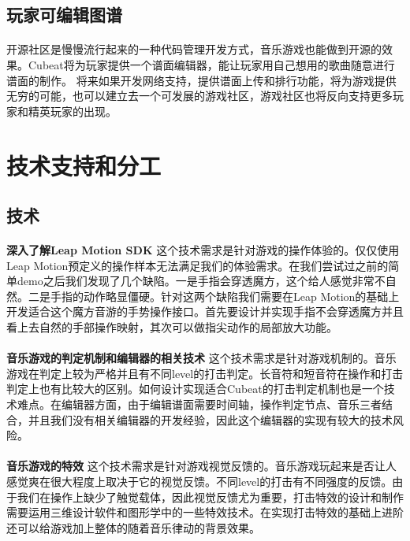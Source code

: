 \documentclass{article}
\begin{document}
\subsection{玩家可编辑图谱}
\paragraph{}
开源社区是慢慢流行起来的一种代码管理开发方式，音乐游戏也能做到开源的效果。Cubeat将为玩家提供一个谱面编辑器，能让玩家用自己想用的歌曲随意进行谱面的制作。
将来如果开发网络支持，提供谱面上传和排行功能，将为游戏提供无穷的可能，也可以建立去一个可发展的游戏社区，游戏社区也将反向支持更多玩家和精英玩家的出现。
\newpage
\section{技术支持和分工}
\subsection{技术}
\paragraph{}
\textbf{深入了解Leap Motion SDK}
这个技术需求是针对游戏的操作体验的。仅仅使用Leap Motion预定义的操作样本无法满足我们的体验需求。在我们尝试过之前的简单demo之后我们发现了几个缺陷。一是手指会穿透魔方，这个给人感觉非常不自然。二是手指的动作略显僵硬。针对这两个缺陷我们需要在Leap Motion的基础上开发适合这个魔方音游的手势操作接口。首先要设计并实现手指不会穿透魔方并且看上去自然的手部操作映射，其次可以做指尖动作的局部放大功能。
\paragraph{}
\textbf{音乐游戏的判定机制和编辑器的相关技术}
这个技术需求是针对游戏机制的。音乐游戏在判定上较为严格并且有不同level的打击判定。长音符和短音符在操作和打击判定上也有比较大的区别。如何设计实现适合Cubeat的打击判定机制也是一个技术难点。在编辑器方面，由于编辑谱面需要时间轴，操作判定节点、音乐三者结合，并且我们没有相关编辑器的开发经验，因此这个编辑器的实现有较大的技术风险。
\paragraph{}
\textbf{音乐游戏的特效}
这个技术需求是针对游戏视觉反馈的。音乐游戏玩起来是否让人感觉爽在很大程度上取决于它的视觉反馈。不同level的打击有不同强度的反馈。由于我们在操作上缺少了触觉载体，因此视觉反馈尤为重要，打击特效的设计和制作需要运用三维设计软件和图形学中的一些特效技术。在实现打击特效的基础上进阶还可以给游戏加上整体的随着音乐律动的背景效果。
\end{document}
